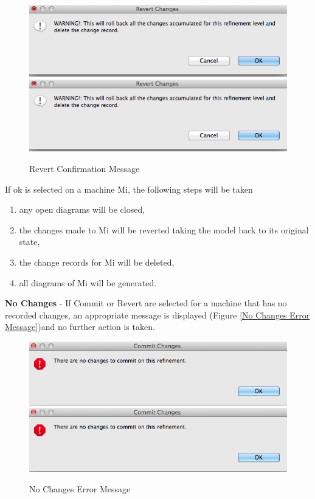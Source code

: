  \begin{figure}[!htbp]
  \centering
  \ifplastex
  \includegraphics[width=1024]{figures/image63.png}
  \else
  \includegraphics[width=1\textwidth]{figures/image63.png}
  \fi
  \caption{Revert Confirmation Message}
  \label{fig:RevertConfirmationMessage}
\end{figure} 

If ok is selected on a machine Mi, the following steps will be taken
\begin{enumerate}
\item any open diagrams will be closed,
\item the changes made to Mi will be reverted taking the model back to its original state,
\item the change records for Mi will be deleted,
\item all diagrams of Mi will be generated.
\end{enumerate}


\textbf{No Changes} - 
If Commit or Revert are selected for a machine that has no recorded changes, an appropriate message is displayed (Figure \ref{No Changes Error Message})and no further action is taken.

 \begin{figure}[!htbp]
  \centering
  \ifplastex
  \includegraphics[width=1024]{figures/image64.png}
  \else
  \includegraphics[width=1\textwidth]{figures/image64.png}
  \fi
  \caption{No Changes Error Message}
  \label{fig:NoChangesErrorMessage}
\end{figure} 


